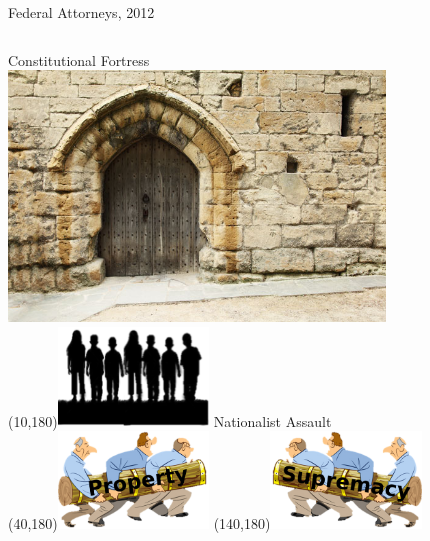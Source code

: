 \begin{frame}{Federal Attorneys, 2012}
\begin{table}[h]
\begin{tabular}{p{} p{}}
\end{tabular}
\end{table}
\end{frame}

\begin{frame}{Constitutional Fortress}
    \centering
    \includegraphics[width=0.75\textwidth]{img/fortress.png} \\
    \pause
    \Put(10,180){\includegraphics[width=0.3\textwidth]{img/family.png}}
    \pause
    { \color{red} \huge{Nationalist Assault} \\}
    \pause
    \Put(40,180){\includegraphics[width=0.3\textwidth]{img/property-ram.png}}
    \pause
    \Put(140,180){\includegraphics[width=0.3\textwidth]{img/supremacy-ram.png}}
\end{frame}

